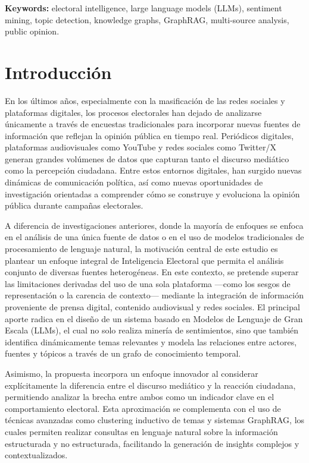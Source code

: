 \documentclass[listof=nochaptergap,12pt,times,authoryear]{report}
\begin{document}
\textbf{Keywords: } electoral intelligence, large language models (LLMs), sentiment mining, topic detection, knowledge graphs, GraphRAG, multi-source analysis, public opinion.

\chapter*{Introducción}

En los últimos años, especialmente con la masificación de las redes sociales y plataformas digitales, los procesos electorales han dejado de analizarse únicamente a través de encuestas tradicionales para incorporar nuevas fuentes de información que reflejan la opinión pública en tiempo real. Periódicos digitales, plataformas audiovisuales como YouTube y redes sociales como Twitter/X generan grandes volúmenes de datos que capturan tanto el discurso mediático como la percepción ciudadana. Entre estos entornos digitales, han surgido nuevas dinámicas de comunicación política, así como nuevas oportunidades de investigación orientadas a comprender cómo se construye y evoluciona la opinión pública durante campañas electorales.

A diferencia de investigaciones anteriores, donde la mayoría de enfoques se enfoca en el análisis de una única fuente de datos o en el uso de modelos tradicionales de procesamiento de lenguaje natural, la motivación central de este estudio es plantear un enfoque integral de Inteligencia Electoral que permita el análisis conjunto de diversas fuentes heterogéneas. En este contexto, se pretende superar las limitaciones derivadas del uso de una sola plataforma —como los sesgos de representación o la carencia de contexto— mediante la integración de información proveniente de prensa digital, contenido audiovisual y redes sociales. El principal aporte radica en el diseño de un sistema basado en Modelos de Lenguaje de Gran Escala (LLMs), el cual no solo realiza minería de sentimientos, sino que también identifica dinámicamente temas relevantes y modela las relaciones entre actores, fuentes y tópicos a través de un grafo de conocimiento temporal.

Asimismo, la propuesta incorpora un enfoque innovador al considerar explícitamente la diferencia entre el discurso mediático y la reacción ciudadana, permitiendo analizar la brecha entre ambos como un indicador clave en el comportamiento electoral. Esta aproximación se complementa con el uso de técnicas avanzadas como clustering inductivo de temas y sistemas GraphRAG, los cuales permiten realizar consultas en lenguaje natural sobre la información estructurada y no estructurada, facilitando la generación de insights complejos y contextualizados.
\end{document}
